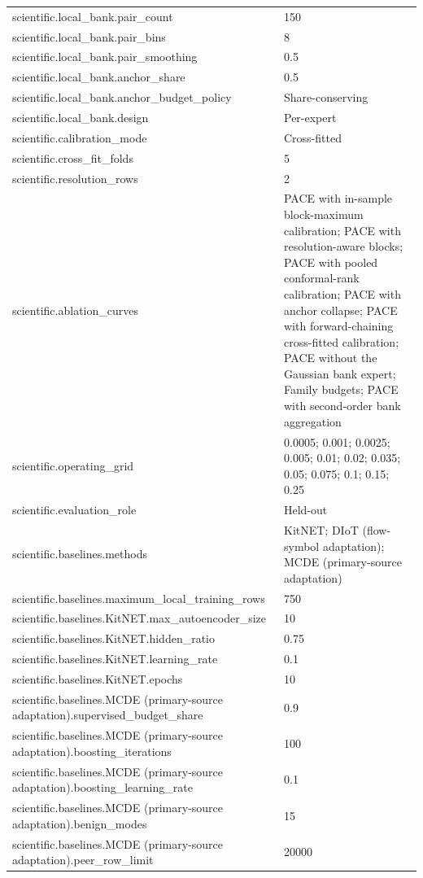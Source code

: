 \begin{tabular}{ll}
scientific.local\_bank.pair\_count & 150 \\
scientific.local\_bank.pair\_bins & 8 \\
scientific.local\_bank.pair\_smoothing & 0.5 \\
scientific.local\_bank.anchor\_share & 0.5 \\
scientific.local\_bank.anchor\_budget\_policy & Share-conserving \\
scientific.local\_bank.design & Per-expert \\
scientific.calibration\_mode & Cross-fitted \\
scientific.cross\_fit\_folds & 5 \\
scientific.resolution\_rows & 2 \\
scientific.ablation\_curves & PACE with in-sample block-maximum calibration; PACE with resolution-aware blocks; PACE with pooled conformal-rank calibration; PACE with anchor collapse; PACE with forward-chaining cross-fitted calibration; PACE without the Gaussian bank expert; Family budgets; PACE with second-order bank aggregation \\
scientific.operating\_grid & 0.0005; 0.001; 0.0025; 0.005; 0.01; 0.02; 0.035; 0.05; 0.075; 0.1; 0.15; 0.25 \\
scientific.evaluation\_role & Held-out \\
scientific.baselines.methods & KitNET; DIoT (flow-symbol adaptation); MCDE (primary-source adaptation) \\
scientific.baselines.maximum\_local\_training\_rows & 750 \\
scientific.baselines.KitNET.max\_autoencoder\_size & 10 \\
scientific.baselines.KitNET.hidden\_ratio & 0.75 \\
scientific.baselines.KitNET.learning\_rate & 0.1 \\
scientific.baselines.KitNET.epochs & 10 \\
scientific.baselines.MCDE (primary-source adaptation).supervised\_budget\_share & 0.9 \\
scientific.baselines.MCDE (primary-source adaptation).boosting\_iterations & 100 \\
scientific.baselines.MCDE (primary-source adaptation).boosting\_learning\_rate & 0.1 \\
scientific.baselines.MCDE (primary-source adaptation).benign\_modes & 15 \\
scientific.baselines.MCDE (primary-source adaptation).peer\_row\_limit & 20000 \\

\end{tabular}
